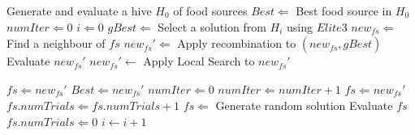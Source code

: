 \documentclass[sn-mathphys]{sn-jnl}%
\theoremstyle{thmstyleone}%
\theoremstyle{thmstyletwo}%
\theoremstyle{thmstylethree}%
\begin{document}
\begin{algorithm}
\small
\caption{\label{algfEABC} Schema of the $fEABC$ Algorithm}
\begin{center}
\begin{algorithmic}[1]
    	\State{}
	\State Generate and evaluate a hive $H_0$ of food sources
	\State $Best \Leftarrow $ Best food source in $H_0$
	\State $\mathit{numIter} \Leftarrow 0$
	\State $i \Leftarrow 0$
	    	\State{}
	    	\State $\mathit{gBest} \Leftarrow$ Select a solution from $H_{i}$ using $Elite3$
	    \State ${new_\mathit{fs} \Leftarrow}$ Find a neighbour of $\mathit{fs}$	
	    	\State ${new_\mathit{fs}' \Leftarrow}$ Apply recombination to ${(new_\mathit{fs}, \mathit{gBest})}$
		    \State Evaluate $new_\mathit{fs}'$
			\State{}	
	    	\State ${new_\mathit{fs}'\leftarrow}$ Apply Local Search to $new_\mathit{fs}'$

	    	\State{}
			\State $\mathit{fs} \Leftarrow {new_\mathit{fs}'}$
			\State ${Best}  \Leftarrow {new_\mathit{fs}'}$
  			\State $numIter \Leftarrow 0$
  		\Else
			\State $numIter \Leftarrow numIter+1$
				\State $fs  \Leftarrow {new_\mathit{fs}'}$
	    		\Else
				\State $\mathit{fs.numTrials} \Leftarrow \mathit{fs.numTrials} +1$
			\EndIf
		\EndIf
			\State $\mathit{fs}  \Leftarrow $ Generate random solution
			\State Evaluate $\mathit{fs}$
			\State $\mathit{fs.numTrials} \Leftarrow 0$
		\EndIf
        \EndFor
        \State $i \leftarrow i+1$
	\EndWhile
	\\
\end{algorithmic}
\end{center}
\end{algorithm}
\end{document}
